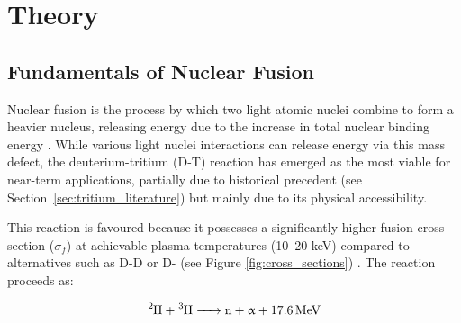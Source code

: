 \documentclass[12pt]{article}
\begin{document}



\section{Theory}
\label{sec:theory}

\subsection{Fundamentals of Nuclear Fusion}
\label{sec:fundamentals_theory}
Nuclear fusion is the process by which two light atomic nuclei combine to form a heavier nucleus,
releasing energy due to the increase in total nuclear binding energy \cite{nuclearphysics}. While
various light nuclei interactions can release energy via this mass defect, the deuterium-tritium
(D-T) reaction has emerged as the most viable for near-term applications, partially due to
historical precedent (see Section~\ref{sec:tritium_literature}) but mainly due to its physical
accessibility.

This reaction is favoured because it possesses a significantly higher fusion cross-section
($\sigma_f$) at achievable plasma temperatures (10--20 keV) compared to alternatives such as D-D or
D- (see Figure \ref{fig:cross_sections}) \cite{heckrotte_factors_1971}. The reaction
proceeds as:

\begin{equation}
    \ce{^2H + ^3H -> n + \upalpha} + \ce{17.6 MeV}
    \label{eq:DT_reaction}
\end{equation}
\end{document}
